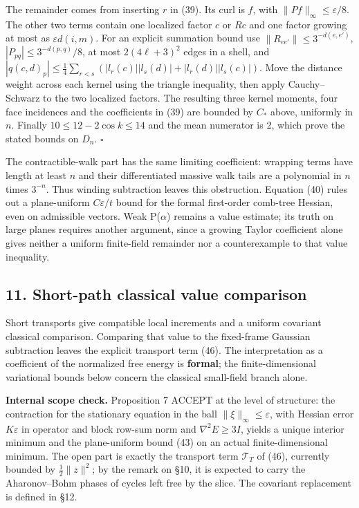 \documentclass[11pt,a4paper]{article}
\begin{document}
The remainder comes from inserting \(r\) in (39). Its curl is \(f\),
with \(\|Pf\|_\infty\le\varepsilon/8\). The other two terms contain one
localized factor \(c\) or \(Rc\) and one factor growing at most as
\(\varepsilon d(i,m)\). For an explicit summation bound use
\(\|R_{ee'}\|\le3^{-d(e,e')}\), \(|P_{pq}|\le3^{-d(p,q)}/8\), at most
\(2(4\ell+3)^2\) edges in a shell, and
\(|q(c,d)_p|\le\frac14\sum_{r<s}(|l_r(c)||l_s(d)|+|l_r(d)||l_s(c)|)\).
Move the distance weight across each kernel using the triangle
inequality, then apply Cauchy--Schwarz to the two localized factors. The
resulting three kernel moments, four face incidences and the
coefficients in (39) are bounded by \(C_*\) above, uniformly in \(n\).
Finally \(10\le12-2\cos k\le14\) and the mean numerator is 2, which
prove the stated bounds on \(D_n\). \(\square\)

The contractible-walk part has the same limiting coefficient: wrapping
terms have length at least \(n\) and their differentiated massive walk
tails are a polynomial in \(n\) times \(3^{-n}\). Thus winding
subtraction leaves this obstruction. Equation (40) rules out a
plane-uniform \(C\varepsilon/t\) bound for the formal first-order
comb-tree Hessian, even on admissible vectors. Weak P(\(\alpha\))
remains a value estimate; its truth on large planes requires another
argument, since a growing Taylor coefficient alone gives neither a
uniform finite-field remainder nor a counterexample to that value
inequality.

\hypertarget{short-path-classical-value-comparison}{%
\subsection{11. Short-path classical value
comparison}\label{short-path-classical-value-comparison}}

Short transports give compatible local increments and a uniform
covariant classical comparison. Comparing that value to the fixed-frame
Gaussian subtraction leaves the explicit transport term (46). The
interpretation as a coefficient of the normalized free energy is
\textbf{formal}; the finite-dimensional variational bounds below concern
the classical small-field branch alone.

\textbf{Internal scope check.} Proposition 7 ACCEPT at the level of
structure: the contraction for the stationary equation in the ball
\(\|\xi\|_\infty\le\varepsilon\), with Hessian error \(K\varepsilon\) in
operator and block row-sum norm and \(\nabla^2E\ge3I\), yields a unique
interior minimum and the plane-uniform bound (43) on an actual
finite-dimensional minimum. The open part is exactly the transport term
\(\mathcal T_T\) of (46), currently bounded by \(\frac12\|z\|^2\); by
the remark on §10, it is expected to carry the Aharonov--Bohm phases of
cycles left free by the slice. The covariant replacement is defined in
§12.
\end{document}

